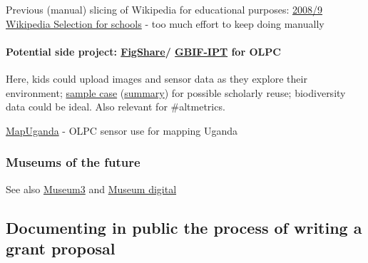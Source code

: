 \documentclass[final,authoryear,3p]{elsarticle-open-drafting}
\begin{document}

Previous (manual) slicing of Wikipedia for educational purposes: \href{http://schools-wikipedia.org}{2008/9 Wikipedia Selection for schools} - too much effort to keep doing manually


\paragraph{Potential side project: \href{http://figshare.com/}{FigShare}/ \href{http://www.gbif.org/communications/news-and-events/showsingle/article/new-incentive-for-biodiversity-data-publishing/}{GBIF-IPT} for OLPC} 
Here, kids could upload images and sensor data as they explore their environment; \href{http://dx.doi.org/10.3897/zookeys.89.903}{sample case} (\href{http://www.eurekalert.org/pub_releases/2011-05/pp-snh051711.php}{summary}) for possible scholarly reuse; biodiversity data could be ideal. Also relevant for \#altmetrics.


\href{http://mapuganda.blogspot.com/}{MapUganda} - OLPC sensor use for mapping Uganda



\subsubsection{Museums of the future}
See also \href{http://museum3.org}{Museum3} and \href{http://www.museum-digital.de/}{Museum digital}
\subsection{Documenting in public the process of writing a grant proposal}
\end{document}
